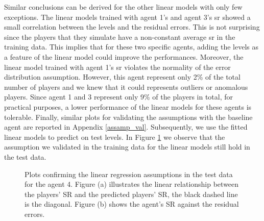 Similar conclusions can be derived for the other linear models with only few exceptions. The linear models trained with agent 1's and agent 3's \acs{sr} showed a small correlation between the levels and the residual errors. This is not surprising since the players that they simulate have a non-constant average \acs{sr} in the training data. This implies that for these two specific agents, adding the levels as a feature of the linear model could improve the performances. Moreover, the linear model trained with agent 1's \acs{sr} violates the normality of the error distribution assumption. However, this agent represent only 2\% of the total number of players and we knew that it could represents outliers or anomalous players. Since agent 1 and 3 represent only 9\% of the players in total, for practical purposes, a lower performance of the linear models for these agents is tolerable. Finally, similar plots for validating the assumptions with the baseline agent are reported in Appendix \ref{assamp_val}.
Subsequently, we use the fitted linear models to predict on test levels.
In Figure \ref{fig:test_example_residuals} we observe that the assumption we validated in the training data for the linear models still hold in the test data.
\begin{figure}[h]
  \centering
    
    \caption{Plots confirming the linear regression assumptions in the test data for the agent 4. Figure (a) illustrates the linear relationship between the players' SR and the predicted players' SR, the black dashed line is the diagonal. Figure (b) shows the agent's SR against the residual errors.}
    \label{fig:test_example_residuals}
\end{figure}
